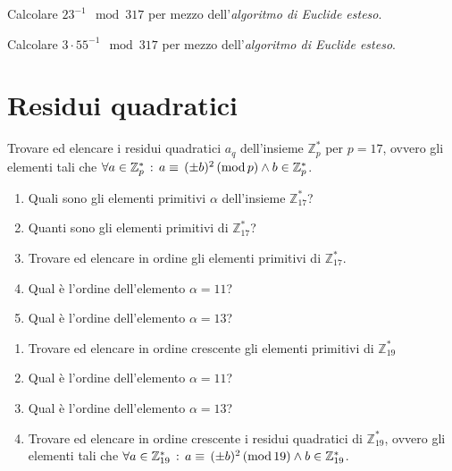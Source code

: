         Calcolare $23^{-1} \mod 317$ per mezzo dell'\emph{algoritmo di Euclide esteso}.

        Calcolare $3\cdot 55^{-1} \mod 317$ per mezzo dell'\emph{algoritmo di Euclide esteso}.

    \bigskip
    \section{Residui quadratici}
        Trovare ed elencare i residui quadratici $a_q$ dell'insieme $\mathbb{Z}^{*}_p$ per $p=17$, ovvero gli 
        elementi tali che $\forall a\in \mathbb{Z}^{*}_p \,:\, a\equiv\,(\pm b)^2\,(\mathrm{mod}\,p) \land b\in \mathbb{Z}^{*}_p$.

        \begin{enumerate}
            \item Quali sono gli elementi primitivi $\alpha$ dell'insieme $\mathbb{Z}^{*}_{17}$?
            \item Quanti sono gli elementi primitivi di $\mathbb{Z}^{*}_{17}$?
            \item Trovare ed elencare in ordine gli elementi primitivi di $\mathbb{Z}^{*}_{17}$.
            \item Qual è l'ordine dell'elemento $\alpha =11$?
            \item Qual è l'ordine dell'elemento $\alpha =13$?
        \end{enumerate}

        \begin{enumerate}
            \item Trovare ed elencare in ordine crescente gli elementi primitivi di $\mathbb{Z}^{*}_{19}$
            \item Qual è l'ordine dell'elemento $\alpha =11$?
            \item Qual è l'ordine dell'elemento $\alpha =13$?
            \item Trovare ed elencare in ordine crescente i residui quadratici di $\mathbb{Z}^{*}_{19}$, ovvero gli 
                elementi tali che $\forall a\in \mathbb{Z}^{*}_{19} \,:\, a\equiv\,(\pm b)^2\,(\mathrm{mod}\,19) \land 
                b\in \mathbb{Z}^{*}_{19}$.
        \end{enumerate}

